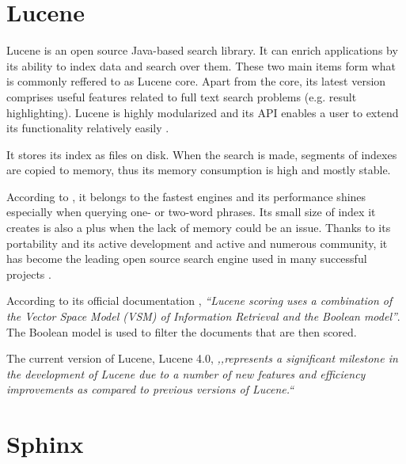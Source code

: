 \section{Lucene}

Lucene \cite{LuceneHome} is an open source Java-based search library. 
It can enrich applications by its ability to index data and search over them. 
These two main items form what is commonly reffered to as Lucene core. 
Apart from the core, its latest version comprises useful features related to full text search problems (e.g. result highlighting). 
Lucene is highly modularized and its API enables a user to extend its functionality relatively easily \cite{McCandless:2010:LAS:1893016}. 

It stores its index as files on disk. When the search is made, segments of indexes are copied to memory, thus its memory consumption is high and mostly stable.

According to \cite{MiddletonBaeza,ComparisonLuceneIndri}, it belongs to the fastest engines and its performance shines especially
when querying one- or two-word phrases. 
Its small size of index it creates is also a plus when the lack of memory could be an issue.
Thanks to its portability and its active development and active and numerous community, it has become the leading open source search engine used in many successful projects \cite{LuceneWhoUses}.

According to its official documentation \cite{LuceneScoring}, 
\textit{``Lucene scoring uses a combination of the Vector Space Model (VSM) of Information Retrieval and the Boolean model''}.
The Boolean model is used to filter the documents that are then scored.

The current version of Lucene, Lucene 4.0, \textit{,,represents a significant milestone in the development of Lucene due to a number of new features and efficiency improvements as compared to previous versions of Lucene.``} \cite{ApacheLucene4}


\section{Sphinx}

